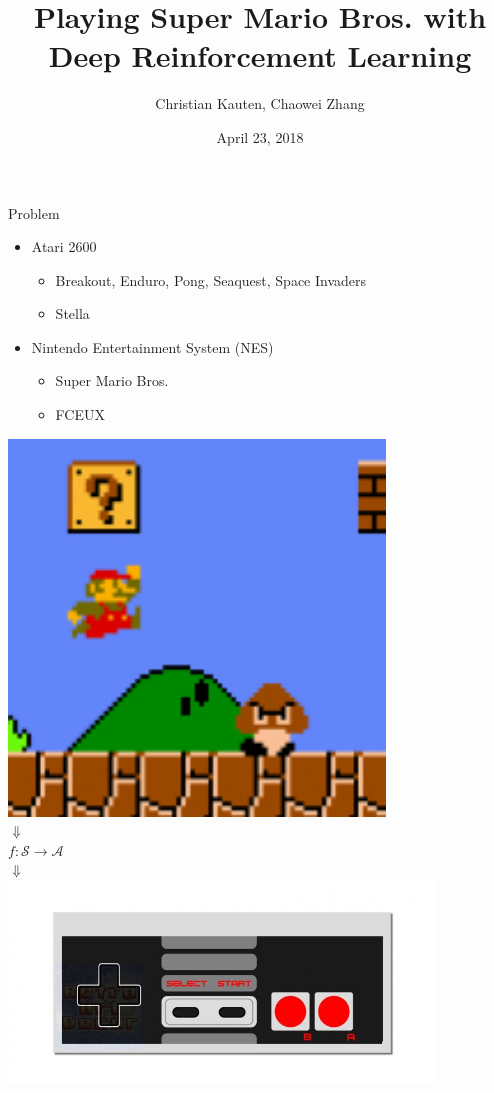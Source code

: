 \documentclass{beamer}
\title{Playing Super Mario Bros. with Deep Reinforcement Learning}
\author{Christian Kauten, Chaowei Zhang}
\institute{Auburn University}
\date{April 23, 2018}
\begin{document}
\frame{\titlepage}



\begin{frame}{Problem}
\begin{minipage}{\textwidth}
%
\begin{minipage}{0.5\textwidth}
\begin{itemize}
    \item{Atari 2600}
        \begin{itemize}
        \item{Breakout, Enduro, Pong, Seaquest, Space Invaders}
        \item{Stella}
        \end{itemize}
    \item{Nintendo Entertainment System (NES)}
        \begin{itemize}
        \item{Super Mario Bros.}
        \item{FCEUX}
        \end{itemize}
\end{itemize}
\end{minipage}
%
\hfill
%
\begin{minipage}[t]{0.5\textwidth}
\centering
\includegraphics[width=0.75\textwidth]{img/smb} \\
$\Downarrow$ \\
$f : \mathcal{S} \to \mathcal{A}$ \\
$\Downarrow$ \\
\includegraphics[width=0.85\textwidth]{img/nes}
\end{minipage}
%
\end{minipage}
\end{frame}
\end{document}
